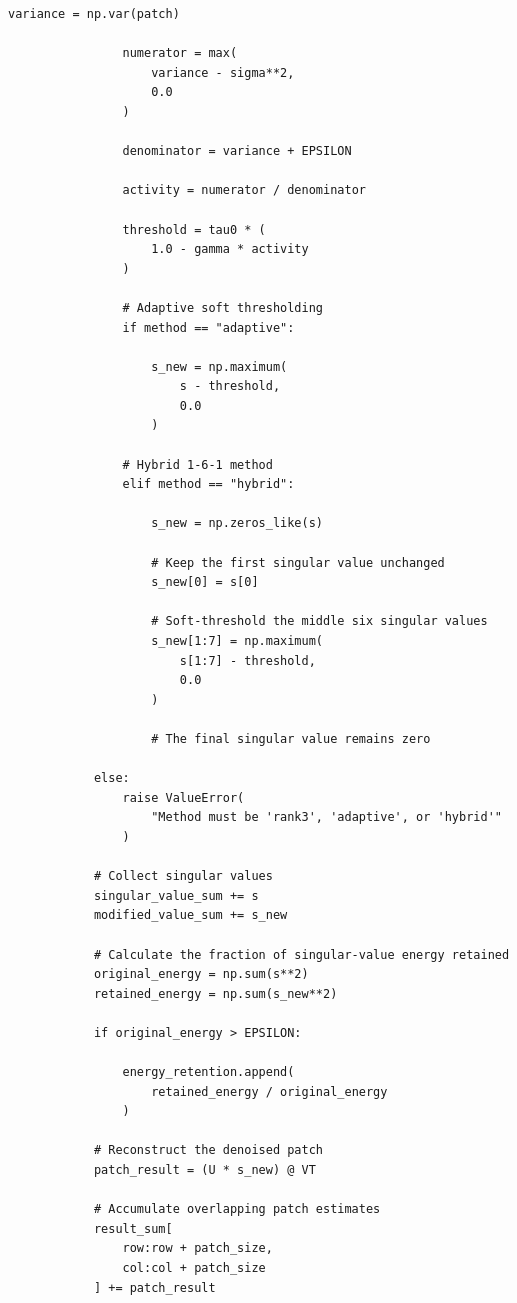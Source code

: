 \documentclass{article}
\begin{document}
\begin{flushleft}
\begin{lstlisting}[caption={Patch-based SVD denoising function (rank-3, adaptive and hybrid 1-6-1)}]
                variance = np.var(patch)

                numerator = max(
                    variance - sigma**2,
                    0.0
                )

                denominator = variance + EPSILON

                activity = numerator / denominator

                threshold = tau0 * (
                    1.0 - gamma * activity
                )

                # Adaptive soft thresholding
                if method == "adaptive":

                    s_new = np.maximum(
                        s - threshold,
                        0.0
                    )

                # Hybrid 1-6-1 method
                elif method == "hybrid":

                    s_new = np.zeros_like(s)

                    # Keep the first singular value unchanged
                    s_new[0] = s[0]

                    # Soft-threshold the middle six singular values
                    s_new[1:7] = np.maximum(
                        s[1:7] - threshold,
                        0.0
                    )

                    # The final singular value remains zero

            else:
                raise ValueError(
                    "Method must be 'rank3', 'adaptive', or 'hybrid'"
                )

            # Collect singular values
            singular_value_sum += s
            modified_value_sum += s_new

            # Calculate the fraction of singular-value energy retained
            original_energy = np.sum(s**2)
            retained_energy = np.sum(s_new**2)

            if original_energy > EPSILON:

                energy_retention.append(
                    retained_energy / original_energy
                )

            # Reconstruct the denoised patch
            patch_result = (U * s_new) @ VT

            # Accumulate overlapping patch estimates
            result_sum[
                row:row + patch_size,
                col:col + patch_size
            ] += patch_result


\end{lstlisting}
\end{flushleft}
\end{document}
